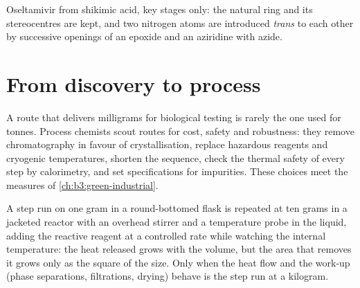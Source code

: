 \begin{omfigure}

{\small Oseltamivir from shikimic acid, key stages only: the natural ring and its
stereocentres are kept, and two nitrogen atoms are introduced \textit{trans} to each other
by successive openings of an epoxide and an aziridine with azide.}
\end{omfigure}

\section{From discovery to process}

A route that delivers milligrams for biological testing is rarely the one used
for tonnes. Process chemists scout routes for cost, safety and robustness:
they remove chromatography in favour of crystallisation, replace hazardous
reagents and cryogenic temperatures, shorten the sequence, check the thermal
safety of every step by calorimetry, and set specifications for impurities.
These choices meet the measures of \cref{ch:b3:green-industrial}.

\begin{inthelab}
A step run on one gram in a round-bottomed flask is repeated at ten grams in a
jacketed reactor with an overhead stirrer and a temperature probe in the
liquid, adding the reactive reagent at a controlled rate while watching the
internal temperature: the heat released grows with the volume, but the area that
removes it grows only as the square of the size. Only when the heat flow and the work-up
(phase separations, filtrations, drying) behave is the step run at a kilogram.
\end{inthelab}

